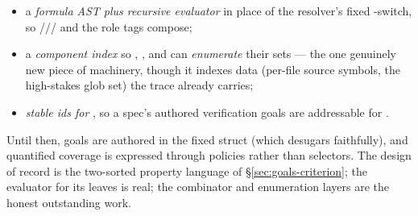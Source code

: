 \begin{itemize}
\item a \emph{formula AST plus recursive evaluator} in place of the resolver's fixed -switch,
so ///\code{=>} and the role tags compose;
\item a \emph{component index} so , , and
 can \emph{enumerate} their sets --- the one genuinely new piece of machinery, though it
indexes data (per-file source symbols, the high-stakes glob set) the trace already carries;
\item \emph{stable ids for }, so a spec's authored verification goals are
addressable for .
\end{itemize}

\noindent Until then, goals are authored in the fixed struct (which desugars faithfully), and quantified
coverage is expressed through \code{[governed]} policies rather than \code{[met]} selectors. The design
of record is the two-sorted property language of \S\ref{sec:goals-criterion}; the evaluator for its
leaves is real; the combinator and enumeration layers are the honest outstanding work.
